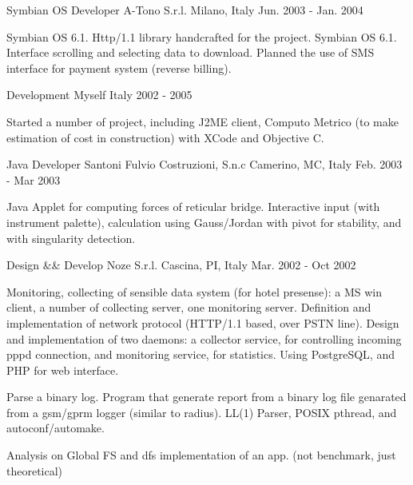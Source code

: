 \begin{cventries}
  \cventry
    {Symbian OS Developer}
    {A-Tono S.r.l.}
    {Milano, Italy}
    {Jun. 2003 - Jan. 2004} %
    {
      \begin{cvitems}
        {Symbian OS 6.1. Http/1.1 library handcrafted for the project.}
        {Symbian OS 6.1. Interface scrolling and selecting data to download.}
        {Planned the use of SMS interface for payment system (reverse billing).}
      \end{cvitems}
    }

  \cventry
    {Development}
    {Myself}
    {Italy}
    {2002 - 2005} %
    {
      \begin{cvitems}
        {Started a number of project, including J2ME client, Computo Metrico (to make estimation of cost in construction) with XCode and Objective C.}
      \end{cvitems}
    }

  \cventry
    {Java Developer} %
    {Santoni Fulvio Costruzioni, S.n.c} %
    {Camerino, MC, Italy} %
    {Feb. 2003 - Mar 2003} %
    {
      \begin{cvitems} %
        \item {Java Applet for computing forces of reticular bridge. Interactive input (with instrument palette), calculation using Gauss/Jordan with pivot for stability, and with singularity detection.}
      \end{cvitems}
    }

  \cventry
    {Design && Develop} %
    {Noze S.r.l.} %
    {Cascina, PI, Italy} %
    {Mar. 2002 - Oct 2002} %
    {
      \begin{cvitems} %
        \item {Monitoring, collecting of sensible data system (for hotel presense): a MS win client, a number of collecting server, one monitoring server. Definition and implementation of network protocol (HTTP/1.1 based, over PSTN line). Design and implementation of two daemons: a collector service, for controlling incoming pppd connection, and monitoring
service, for statistics. Using PostgreSQL, and PHP for web interface.}
        \item {Parse a binary log. Program that generate report from a binary log file genarated from a gsm/gprm logger (similar to radius). LL(1) Parser, POSIX pthread, and autoconf/automake.}
        \item {Analysis on Global FS and dfs implementation of an app. (not benchmark, just theoretical) }
      \end{cvitems}
    }

\end{cventries}